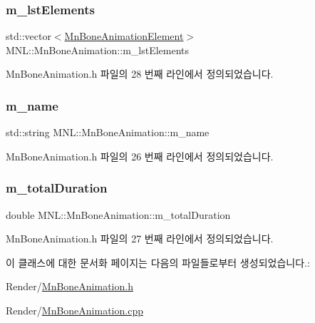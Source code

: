 \subsubsection{\texorpdfstring{m\+\_\+lst\+Elements}{m\_lstElements}}
{\footnotesize\ttfamily std\+::vector$<$\hyperlink{class_m_n_l_1_1_mn_bone_animation_element}{Mn\+Bone\+Animation\+Element}$>$ M\+N\+L\+::\+Mn\+Bone\+Animation\+::m\+\_\+lst\+Elements\hspace{0.3cm}{\ttfamily [private]}}



Mn\+Bone\+Animation.\+h 파일의 28 번째 라인에서 정의되었습니다.

\mbox{\label{class_m_n_l_1_1_mn_bone_animation_a87c5e79d5169c58db4fb0a581333eefc}} 
\subsubsection{\texorpdfstring{m\+\_\+name}{m\_name}}
{\footnotesize\ttfamily std\+::string M\+N\+L\+::\+Mn\+Bone\+Animation\+::m\+\_\+name\hspace{0.3cm}{\ttfamily [private]}}



Mn\+Bone\+Animation.\+h 파일의 26 번째 라인에서 정의되었습니다.

\mbox{\label{class_m_n_l_1_1_mn_bone_animation_a01d7e4fb6175d5492b699473df7a9650}} 
\subsubsection{\texorpdfstring{m\+\_\+total\+Duration}{m\_totalDuration}}
{\footnotesize\ttfamily double M\+N\+L\+::\+Mn\+Bone\+Animation\+::m\+\_\+total\+Duration\hspace{0.3cm}{\ttfamily [private]}}



Mn\+Bone\+Animation.\+h 파일의 27 번째 라인에서 정의되었습니다.



이 클래스에 대한 문서화 페이지는 다음의 파일들로부터 생성되었습니다.\+:\begin{DoxyCompactItemize}
\item 
Render/\hyperlink{_mn_bone_animation_8h}{Mn\+Bone\+Animation.\+h}\item 
Render/\hyperlink{_mn_bone_animation_8cpp}{Mn\+Bone\+Animation.\+cpp}\end{DoxyCompactItemize}
